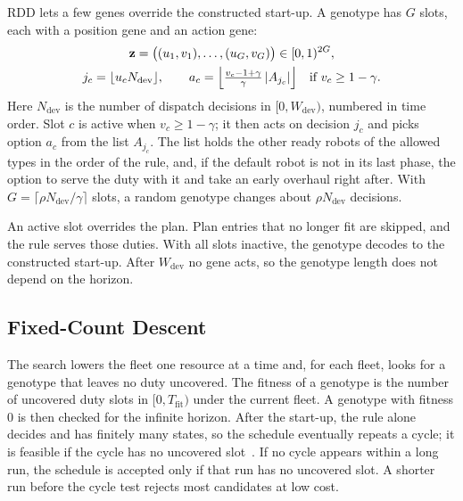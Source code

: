 RDD lets a few genes override the constructed start-up.
A genotype has $G$ slots, each with a position gene and an action gene:
\begin{equation}
\begin{gathered}
  \mathbf{z} = \bigl((u_1, v_1), \dots, (u_G, v_G)\bigr) \in [0,1)^{2G},\\
  j_c = \lfloor u_c N_{\mathrm{dev}} \rfloor, \qquad
  a_c = \Bigl\lfloor \tfrac{v_c - 1 + \gamma}{\gamma}\, |A_{j_c}| \Bigr\rfloor \quad \text{if } v_c \ge 1 - \gamma .
\end{gathered}
\label{eq:genotype}
\end{equation}
Here $N_{\mathrm{dev}}$ is the number of dispatch decisions in $[0, W_{\mathrm{dev}})$, numbered in time order.
Slot $c$ is active when $v_c \ge 1 - \gamma$; it then acts on decision $j_c$ and picks option $a_c$ from the list $A_{j_c}$.
The list holds the other ready robots of the allowed types in the order of the rule, and, if the default robot is not in its last phase, the option to serve the duty with it and take an early overhaul right after.
With $G = \lceil \rho N_{\mathrm{dev}} / \gamma \rceil$ slots, a random genotype changes about $\rho N_{\mathrm{dev}}$ decisions.

An active slot overrides the plan.
Plan entries that no longer fit are skipped, and the rule serves those duties.
With all slots inactive, the genotype decodes to the constructed start-up.
After $W_{\mathrm{dev}}$ no gene acts, so the genotype length does not depend on the horizon.

\subsection{Fixed-Count Descent}
\label{sec:method:fd}

The search lowers the fleet one resource at a time and, for each fleet, looks for a genotype that leaves no duty uncovered.
The fitness of a genotype is the number of uncovered duty slots in $[0, T_{\mathrm{fit}})$ under the current fleet.
A genotype with fitness $0$ is then checked for the infinite horizon.
After the start-up, the rule alone decides and has finitely many states, so the schedule eventually repeats a cycle; it is feasible if the cycle has no uncovered slot~\cite{grolleau2013periodic}.
If no cycle appears within a long run, the schedule is accepted only if that run has no uncovered slot.
A shorter run before the cycle test rejects most candidates at low cost.


